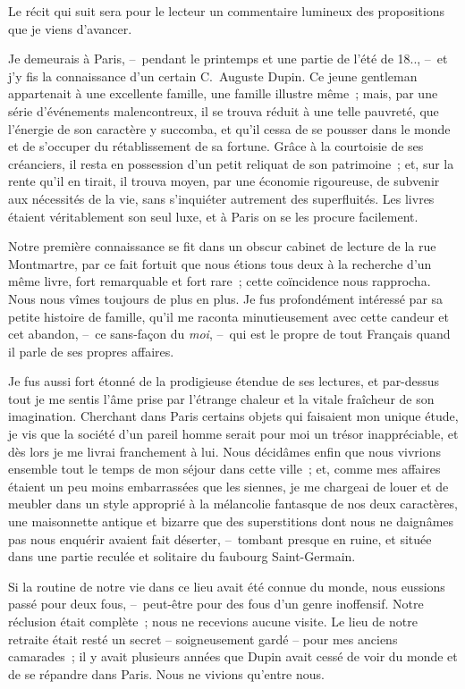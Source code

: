 \documentclass[french,twoside]{book} %
\begin{document}
Le récit qui suit sera pour le lecteur un commentaire lumineux des propositions que je viens d’avancer.\par
Je demeurais à Paris, – pendant le printemps et une partie de l’été de 18.., – et j’y fis la connaissance d’un certain C. Auguste Dupin. Ce jeune gentleman appartenait à une excellente famille, une famille illustre même ; mais, par une série d’événements malencontreux, il se trouva réduit à une telle pauvreté, que l’énergie de son caractère y succomba, et qu’il cessa de se pousser dans le monde et de s’occuper du rétablissement de sa fortune. Grâce à la courtoisie de ses créanciers, il resta en possession d’un petit reliquat de son patrimoine ; et, sur la rente qu’il en tirait, il trouva moyen, par une économie rigoureuse, de subvenir aux nécessités de la vie, sans s’inquiéter autrement des superfluités. Les livres étaient véritablement son seul luxe, et à Paris on se les procure facilement.\par
Notre première connaissance se fit dans un obscur cabinet de lecture de la rue Montmartre, par ce fait fortuit que nous étions tous deux à la recherche d’un même livre, fort remarquable et fort rare ; cette coïncidence nous rapprocha. Nous nous vîmes toujours de plus en plus. Je fus profondément intéressé par sa petite histoire de famille, qu’il me raconta minutieusement avec cette candeur et cet abandon, – ce sans-façon du \emph{moi}, – qui est le propre de tout Français quand il parle de ses propres affaires.\par
Je fus aussi fort étonné de la prodigieuse étendue de ses lectures, et par-dessus tout je me sentis l’âme prise par l’étrange chaleur et la vitale fraîcheur de son imagination. Cherchant dans Paris certains objets qui faisaient mon unique étude, je vis que la société d’un pareil homme serait pour moi un trésor inappréciable, et dès lors je me livrai franchement à lui. Nous décidâmes enfin que nous vivrions ensemble tout le temps de mon séjour dans cette ville ; et, comme mes affaires étaient un peu moins embarrassées que les siennes, je me chargeai de louer et de meubler dans un style approprié à la mélancolie fantasque de nos deux caractères, une maisonnette antique et bizarre que des superstitions dont nous ne daignâmes pas nous enquérir avaient fait déserter, – tombant presque en ruine, et située dans une partie reculée et solitaire du faubourg Saint-Germain.\par
Si la routine de notre vie dans ce lieu avait été connue du monde, nous eussions passé pour deux fous, – peut-être pour des fous d’un genre inoffensif. Notre réclusion était complète ; nous ne recevions aucune visite. Le lieu de notre retraite était resté un secret – soigneusement gardé – pour mes anciens camarades ; il y avait plusieurs années que Dupin avait cessé de voir du monde et de se répandre dans Paris. Nous ne vivions qu’entre nous.\par
\end{document}
